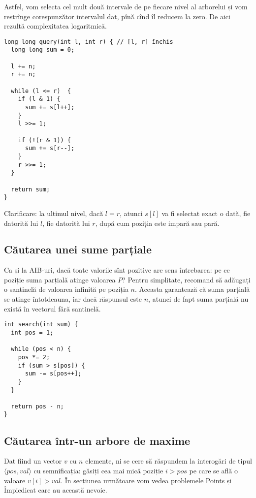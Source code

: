 Astfel, vom selecta cel mult două intervale de pe fiecare nivel al arborelui și vom restrînge corespunzător intervalul dat, pînă cînd îl reducem la zero. De aici rezultă complexitatea logaritmică.

\begin{verbatim}
long long query(int l, int r) { // [l, r] închis
  long long sum = 0;

  l += n;
  r += n;

  while (l <= r)  {
    if (l & 1) {
      sum += s[l++];
    }
    l >>= 1;

    if (!(r & 1)) {
      sum += s[r--];
    }
    r >>= 1;
  }

  return sum;
}
\end{verbatim}

Clarificare: la ultimul nivel, dacă $l = r$, atunci $s[l]$ va fi selectat exact o dată, fie datorită lui $l$, fie datorită lui $r$, după cum poziția este impară sau pară.

\subsection{Căutarea unei sume parțiale}

Ca și la AIB-uri, dacă toate valorile sînt pozitive are sens întrebarea: pe ce poziție suma parțială atinge valoarea $P$? Pentru simplitate, recomand să adăugați o santinelă de valoarea infinită pe poziția $n$. Aceasta garantează că suma parțială se atinge întotdeauna, iar dacă răspunsul este $n$, atunci de fapt suma parțială nu există în vectorul fără santinelă.

\begin{verbatim}
int search(int sum) {
  int pos = 1;

  while (pos < n) {
    pos *= 2;
    if (sum > s[pos]) {
      sum -= s[pos++];
    }
  }

  return pos - n;
}
\end{verbatim}

\subsection{Căutarea într-un arbore de maxime}

Dat fiind un vector $v$ cu $n$ elemente, ni se cere să răspundem la interogări de tipul $\langle pos, val \rangle$ cu semnificația: găsiți cea mai mică poziție $i > pos$ pe care se află o valoare $v[i] > val$. În secțiunea următoare vom vedea problemele Points și Împiedicat care au această nevoie.

